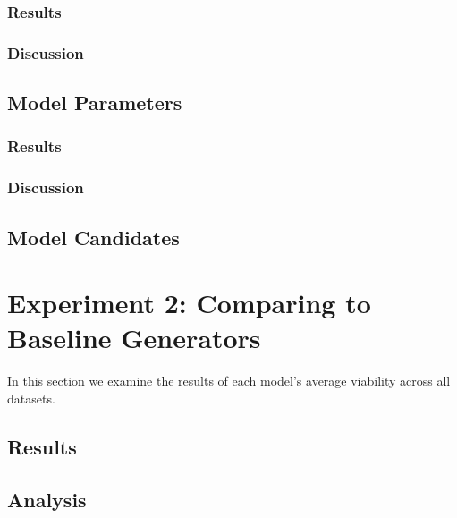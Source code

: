 \documentclass[12pt,a4paper]{report}
\begin{document}
\subsubsection{Results}

\subsubsection{Discussion}

\subsection{Model Parameters}
\subsubsection{Results}

\subsubsection{Discussion}

\subsection{Model Candidates}




\section{Experiment 2: Comparing to Baseline Generators}
\label{sec:experiment2}
In this section we examine the results of each model's average viability across all datasets. 
\subsection{Results}


\subsection{Analysis}


\end{document}
